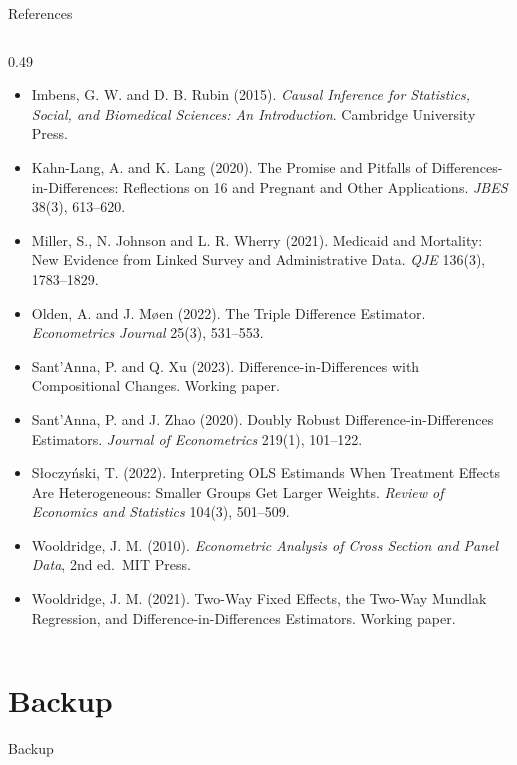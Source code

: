 \documentclass[
  11pt,
  ignorenonframetext,
  aspectratio=169,
]{beamer}
\providecommand{\tightlist}{%
  \setlength{\itemsep}{0pt}\setlength{\parskip}{0pt}}
\begin{document}
\begin{frame}{References}
\begin{columns}[T]
\begin{column}{0.49\linewidth}
\begin{itemize}
\tightlist
\item
  Imbens, G. W. and D. B. Rubin (2015). \emph{Causal Inference for
  Statistics, Social, and Biomedical Sciences: An Introduction}.
  Cambridge University Press.
\item
  Kahn-Lang, A. and K. Lang (2020). The Promise and Pitfalls of
  Differences-in-Differences: Reflections on 16 and Pregnant and Other
  Applications. \emph{JBES} 38(3), 613--620.
\item
  Miller, S., N. Johnson and L. R. Wherry (2021). Medicaid and
  Mortality: New Evidence from Linked Survey and Administrative Data.
  \emph{QJE} 136(3), 1783--1829.
\item
  Olden, A. and J. Møen (2022). The Triple Difference Estimator.
  \emph{Econometrics Journal} 25(3), 531--553.
\item
  Sant'Anna, P. and Q. Xu (2023). Difference-in-Differences with
  Compositional Changes. Working paper.
\item
  Sant'Anna, P. and J. Zhao (2020). Doubly Robust
  Difference-in-Differences Estimators. \emph{Journal of Econometrics}
  219(1), 101--122.
\item
  Słoczyński, T. (2022). Interpreting OLS Estimands When Treatment
  Effects Are Heterogeneous: Smaller Groups Get Larger Weights.
  \emph{Review of Economics and Statistics} 104(3), 501--509.
\item
  Wooldridge, J. M. (2010). \emph{Econometric Analysis of Cross Section
  and Panel Data}, 2nd ed.~MIT Press.
\item
  Wooldridge, J. M. (2021). Two-Way Fixed Effects, the Two-Way Mundlak
  Regression, and Difference-in-Differences Estimators. Working paper.
\end{itemize}
\end{column}
\end{columns}
\end{frame}

\section{Backup}\label{backup}

\begin{frame}{Backup}
\end{frame}
\end{document}
